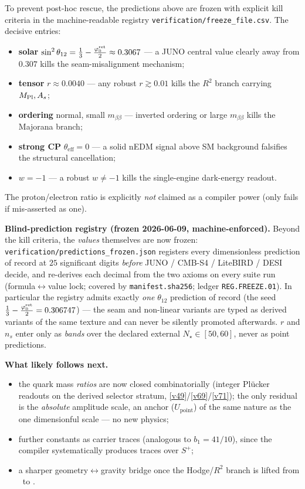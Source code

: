 \begin{winboxnb}
To prevent post-hoc rescue, the predictions above are frozen with explicit kill criteria in the
machine-readable registry \texttt{verification/freeze\_file.csv}. The decisive entries:
\begin{itemize}[leftmargin=1.4em,itemsep=1pt]
\item \textbf{solar} $\sin^2\theta_{12}=\tfrac13-\tfrac{\varphi_0^{\mathrm{ret}}}{2}\approx0.3067$ --- a JUNO central value clearly
  away from $0.307$ kills the seam-misalignment mechanism;
\item \textbf{tensor} $r\approx0.0040$ --- any robust $r\gtrsim0.01$ kills the $R^2$ branch carrying $M_{\mathrm{Pl}},A_s$;
\item \textbf{ordering} normal, small $m_{\beta\beta}$ --- inverted ordering or large $m_{\beta\beta}$ kills the
  Majorana branch;
\item \textbf{strong CP} $\theta_{\mathrm{eff}}=0$ --- a solid nEDM signal above SM background falsifies the
  structural cancellation;
\item \textbf{$w=-1$} --- a robust $w\neq-1$ kills the single-engine dark-energy readout.
\end{itemize}
The proton/electron ratio is explicitly \emph{not} claimed as a compiler power (only fails if mis-asserted as one).
\smallskip

\noindent\textbf{Blind-prediction registry (frozen 2026-06-09, machine-enforced).} Beyond the kill criteria,
the \emph{values} themselves are now frozen: \texttt{verification/predictions\_frozen.json} registers every
dimensionless prediction of record at $25$ significant digits \emph{before} JUNO / CMB-S4 / LiteBIRD / DESI
decide, and  re-derives each decimal from the two axioms on every suite run
(formula$\leftrightarrow$value lock; covered by \texttt{manifest.sha256}; ledger \texttt{REG.FREEZE.01}).
In particular the registry admits exactly \emph{one} $\theta_{12}$ prediction of record (the seed
$\tfrac13-\tfrac{\varphi_0^{\mathrm{ret}}}2=0.306747$) --- the seam and non-linear variants are typed as derived variants of the
same texture and can never be silently promoted afterwards. $r$ and $n_s$ enter only as \emph{bands} over the
declared external $N_\star\in[50,60]$, never as point predictions.
\end{winboxnb}

\noindent\textbf{What likely follows next.}
\begin{itemize}[leftmargin=1.4em]
\item the quark mass \emph{ratios} are now closed combinatorially (integer Pl\"ucker readouts on the derived
      selector stratum, \vref{v49}/\vref{v69}/\vref{v71}); the only residual is the \emph{absolute} amplitude scale, an anchor
      ($U_{\mathrm{point}}$) of the same nature as the one dimensionful scale --- no new physics;
\item further constants as carrier traces (analogous to $b_1=41/10$), since the compiler systematically
      produces traces over $S^+$;
\item a sharper geometry$\leftrightarrow$gravity bridge once the Hodge/$R^2$ branch is lifted from
      \mC\ to \mE.
\end{itemize}

